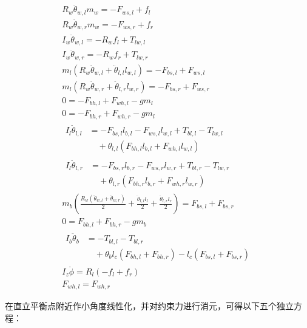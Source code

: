 \begingroup
\setlength{\jot}{0pt}
\begin{gather}
  R_w\ddot{\theta}_{w,l}m_w = -F_{ws,l}+f_l \\
  R_w\ddot{\theta}_{w,r}m_w = -F_{ws,r}+f_r \\
  I_w\ddot{\theta}_{w,l} = -R_wf_l+T_{lw,l} \\
  I_w\ddot{\theta}_{w,r} = -R_wf_r+T_{lw,r} \\
  m_l(R_w\ddot{\theta}_{w,l}+\ddot{\theta}_{l,l}l_{w,l}) = -F_{bs,l}+F_{ws,l} \\
  m_l(R_w\ddot{\theta}_{w,r}+\ddot{\theta}_{l,r}l_{w,r}) = -F_{bs,r}+F_{ws,r} \\
  0 = -F_{bh,l}+F_{wh,l}-gm_l \\
  0 = -F_{bh,r}+F_{wh,r}-gm_l \\
  \begin{aligned}
    I_l\ddot{\theta}_{l,l} &=
    -F_{bs,l}l_{b,l}-F_{ws,l}l_{w,l}+T_{bl,l}-T_{lw,l} \\
    &\quad
    +\theta_{l,l}(F_{bh,l}l_{b,l}+F_{wh,l}l_{w,l})
  \end{aligned} \\
  \begin{aligned}
    I_l\ddot{\theta}_{l,r} &=
    -F_{bs,r}l_{b,r}-F_{ws,r}l_{w,r}+T_{bl,r}-T_{lw,r} \\
    &\quad
    +\theta_{l,r}(F_{bh,r}l_{b,r}+F_{wh,r}l_{w,r})
  \end{aligned} \\
  m_b\left(\frac{R_w(\ddot{\theta}_{w,l}+\ddot{\theta}_{w,r})}{2}
  +\frac{\ddot{\theta}_{l,l}l_l}{2}
  +\frac{\ddot{\theta}_{l,r}l_r}{2}\right)
  = F_{bs,l}+F_{bs,r} \\
  0 = F_{bh,l}+F_{bh,r}-gm_b \\
  \begin{aligned}
    I_b\ddot{\theta}_b &=
    -T_{bl,l}-T_{bl,r} \\
    &\quad
    +\theta_b l_c(F_{bh,l}+F_{bh,r})
    -l_c(F_{bs,l}+F_{bs,r})
  \end{aligned} \\
  I_z\ddot{\phi} = R_l(-f_l+f_r) \\
  F_{wh,l} = F_{wh,r}
\end{gather}
\endgroup

\clearpage
{}

在直立平衡点附近作小角度线性化，并对约束力进行消元，可得以下五个独立方程：

